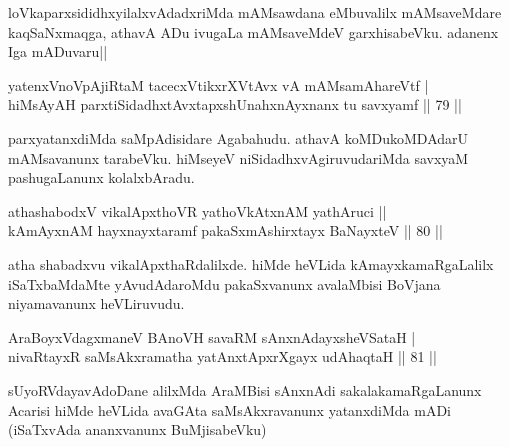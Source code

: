 \begin{artha}
loVkaparxsididhxyilalxvAdadxriMda mAMsawdana eMbuvalilx mAMsaveMdare 
kaqSaNxmaqga, athavA ADu ivugaLa mAMsaveMdeV garxhisabeVku. adanenx 
Iga mADuvaru||
\end{artha}


\begin{shl}
yatenxVnoVpAjiRtaM tacecxVtikxrXVtAvx vA mAMsamAhareVtf | \\
hiMsAyAH parxtiSidadhxtAvxtapxshUnahxnAyxnanx tu savxyamf \hfill|| 79 || 
\end{shl}

\begin{artha}
parxyatanxdiMda saMpAdisidare Agabahudu. athavA koMDukoMDAdarU 
mAMsavanunx tarabeVku. hiMseyeV niSidadhxvAgiruvudariMda savxyaM 
pashugaLanunx kolalxbAradu.
\end{artha}


\begin{shl}
athashabodxV vikalApxthoVR yathoVkAtxnAM yathAruci || \\
kAmAyxnAM hayxnayxtaramf pakaSxmAshirxtayx BaNayxteV \hfill|| 80 || 
\end{shl}

\begin{artha}
atha shabadxvu vikalApxthaRdalilxde. hiMde heVLida kAmayxkamaRgaLalilx iSaTxbaMdaMte yAvudAdaroMdu pakaSxvanunx avalaMbisi 
BoVjana niyamavanunx heVLiruvudu.
\end{artha}


\begin{shl}
AraBoyxVdagxmaneV BAnoVH savaRM sAnxnAdayxsheVSataH | \\
nivaRtayxR saMsAkxramatha yatAnxtApxrXgayx udAhaqtaH \hfill|| 81 || 
\end{shl}

\begin{artha}
sUyoRVdayavAdoDane alilxMda AraMBisi sAnxnAdi sakalakamaRgaLanunx 
Acarisi hiMde heVLida avaGAta saMsAkxravanunx yatanxdiMda mADi 
(iSaTxvAda ananxvanunx BuMjisabeVku)
\end{artha}


